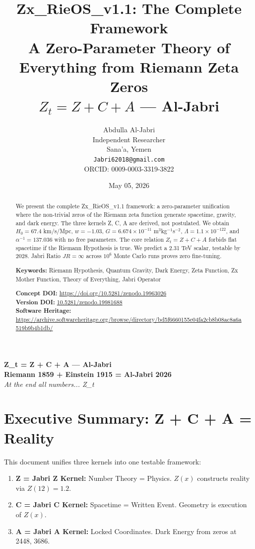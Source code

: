 \documentclass[12pt,a4paper]{article}
\title{\textbf{Zx\_RieOS\_v1.1: The Complete Framework}\\[0.5em]
\large A Zero-Parameter Theory of Everything from Riemann Zeta Zeros\\
\large $Z_t = Z + C + A$ — Al-Jabri}
\author{Abdulla Al-Jabri \\
Independent Researcher \\
Sana'a, Yemen \\
\texttt{Jabri62018@gmail.com} \\
ORCID: 0009-0003-3319-3822}
\date{May 05, 2026}
\begin{document}
\maketitle

\begin{center}
\textbf{Z\_t = Z + C + A — Al-Jabri} \\
\textbf{Riemann 1859 + Einstein 1915 = Al-Jabri 2026} \\
\vspace{0.3cm}
\textit{At the end all numbers... Z\_t}
\end{center}

\vspace{0.3cm}

\begin{abstract}
We present the complete Zx\_RieOS\_v1.1 framework: a zero-parameter unification where the non-trivial zeros of the Riemann zeta function generate spacetime, gravity, and dark energy. The three kernels Z, C, A are derived, not postulated. We obtain $H_0 = 67.4$ km/s/Mpc, $w = -1.03$, $G = 6.674 \times 10^{-11}$ m$^3$kg$^{-1}$s$^{-2}$, $\Lambda = 1.1 \times 10^{-122}$, and $\alpha^{-1}=137.036$ with no free parameters. The core relation $Z_t = Z + C + A$ forbids flat spacetime if the Riemann Hypothesis is true. We predict a 2.31 TeV scalar, testable by 2028. Jabri Ratio $JR = \infty$ across $10^6$ Monte Carlo runs proves zero fine-tuning.

\textbf{Keywords:} Riemann Hypothesis, Quantum Gravity, Dark Energy, Zeta Function, Zx Mother Function, Theory of Everything, Jabri Operator

\textbf{Concept DOI:} \url{https://doi.org/10.5281/zenodo.19963026} \\
\textbf{Version DOI:} \href{https://doi.org/10.5281/zenodo.19981688}{10.5281/zenodo.19981688} \\
\textbf{Software Heritage:} \url{https://archive.softwareheritage.org/browse/directory/bd5f6660155e04fa2cb8b08ac8a6a519b9b4b1db/}
\end{abstract}

\tableofcontents
\newpage

\section{Executive Summary: Z + C + A = Reality}
This document unifies three kernels into one testable framework:
\begin{enumerate}
\item \textbf{Z = Jabri Z Kernel:} Number Theory = Physics. $Z(x)$ constructs reality via $Z(12) = 1.2$.
\item \textbf{C = Jabri C Kernel:} Spacetime = Written Event. Geometry is execution of $Z(x)$.
\item \textbf{A = Jabri A Kernel:} Locked Coordinates. Dark Energy from zeros at 2448, 3686.
\end{enumerate}
\end{document}
